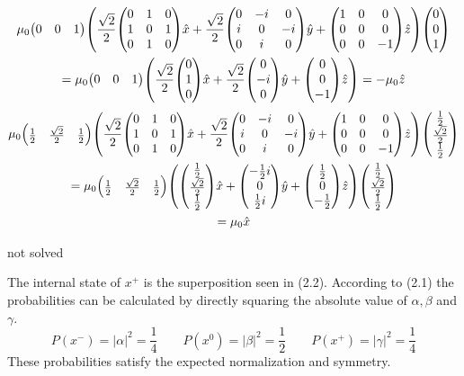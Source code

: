 \documentclass{theoblatt}
\begin{document}
\begin{gather*}
    \\
    \mu_0 \mqty( 0 & 0 & 1 ) \qty(\frac{\sqrt2}2\mqty(0&1&0\\1&0&1\\0&1&0)\hat x+\frac{\sqrt2}2\mqty(0&-i&0\\i&0&-i\\0&i&0)\hat y+\mqty(1&0&0\\0&0&0\\0&0&-1)\hat z)\mqty(0\\0\\1) \\
    = \mu_0 \mqty(0&0&1) \qty(\frac{\sqrt2}2\mqty(0\\1\\0)\hat x +\frac{\sqrt2}2\mqty(0\\-i\\0)\hat y + \mqty(0\\0\\-1)\hat z) = -\mu_0\hat z
    \\
\end{gather*}
\newpage
\ttask
\begin{gather*}
    \mu_0 \mqty( \frac12 & \frac{\sqrt2}2 & \frac12 ) \qty(\frac{\sqrt2}2\mqty(0&1&0\\1&0&1\\0&1&0)\hat x+\frac{\sqrt2}2\mqty(0&-i&0\\i&0&-i\\0&i&0)\hat y+\mqty(1&0&0\\0&0&0\\0&0&-1)\hat z)\mqty( \frac12 \\ \frac{\sqrt2}2 \\ \frac12 ) \\
    = \mu_0 \mqty( \frac12 & \frac{\sqrt2}2 & \frac12 ) \qty(\mqty(\frac12 \\ \frac{\sqrt2}2\\\frac12)\hat x+\mqty(-\frac12i\\0\\\frac12i)\hat y+\mqty(\frac12\\0\\-\frac12)\hat z)\mqty( \frac12 \\ \frac{\sqrt2}2 \\ \frac12 ) \\
    = \mu_0 \hat x
\end{gather*}

\ttask not solved

\ttask The internal state of $x^+$ is the superposition seen in (2.2). According to (2.1) the probabilities can be calculated by directly squaring the absolute value of $\alpha, \beta$ and $\gamma$.
\[ P(x^-) = |\alpha|^2 = \frac14 \qquad P(x^0)=|\beta|^2=\frac12 \qquad P(x^+)=|\gamma|^2=\frac14 \]
These probabilities satisfy the expected normalization and symmetry.
\end{document}
